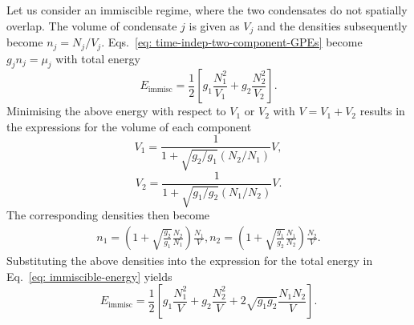 Let us consider an immiscible regime, where the two condensates do not spatially
overlap.
The volume of condensate \(j\) is given as \(V_j\) and the densities
subsequently become \(n_j=N_j/V_j\).
Eqs.~\eqref{eq: time-indep-two-component-GPEs} become \(g_j n_j = \mu_j\) with
total energy
\begin{equation}\label{eq: immiscible-energy}
    E_\mathrm{immisc} = \frac{1}{2}\left[g_1\frac{N_1^2}{V_1}
        + g_2\frac{N_2^2}{V_2}\right].
\end{equation}
Minimising the above energy with respect to \(V_1\) or \(V_2\) with
\(V=V_1+V_2\) results in the expressions for the volume of each component
\begin{equation}
    V_1 = \frac{1}{1 + \sqrt{g_2/g_1}(N_2/N_1)}V,
\end{equation}
\begin{equation}
    V_2 = \frac{1}{1 + \sqrt{g_1/g_2}(N_1/N_2)}V.
\end{equation}
The corresponding densities then become
\begin{equation}
    \begin{aligned}
        n_1 = \left(1 + \sqrt{\frac{g_2}{g_1}}\frac{N_2}{N_1}\right)
        \frac{N_1}{V},
        n_2 = \left(1 + \sqrt{\frac{g_1}{g_2}}\frac{N_1}{N_2}\right)
        \frac{N_2}{V}.
    \end{aligned}
\end{equation}
Substituting the above densities into the expression for the total energy
in Eq.~\eqref{eq: immiscible-energy} yields
\begin{equation}
    E_\mathrm{immisc} = \frac{1}{2}\left[g_1\frac{N_1^2}{V} + g_2\frac{N_2^2}{V}
        + 2\sqrt{g_1g_2}\frac{N_1N_2}{V}\right].
\end{equation}

